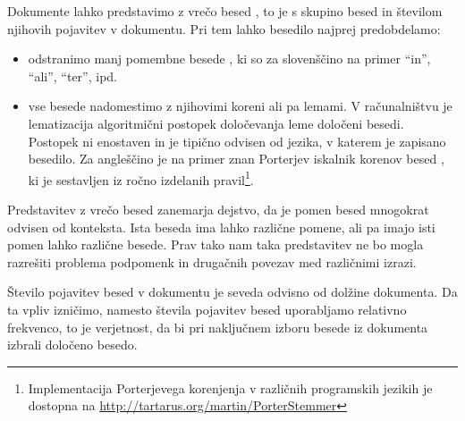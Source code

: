 Dokumente lahko predstavimo z vrečo besed , to je s
skupino besed in številom njihovih pojavitev v dokumentu. Pri tem
lahko besedilo najprej predobdelamo:
\begin{itemize}
\item odstranimo manj pomembne besede , ki so za
  slovenščino na primer ``in'', ``ali'', ``ter'', ipd.
\item vse besede nadomestimo z njihovimi koreni ali pa lemami. V
  računalništvu je lematizacija algoritmični postopek določevanja leme
  določeni besedi. Postopek ni enostaven in je tipično odvisen od
  jezika, v katerem je zapisano besedilo. Za angleščino je na primer
  znan Porterjev iskalnik korenov besed , ki je
  sestavljen iz ročno izdelanih pravil\footnote{Implementacija
    Porterjevega korenjenja v različnih programskih jezikih je
    dostopna na \url{http://tartarus.org/martin/PorterStemmer}}.
\end{itemize}

Predstavitev z vrečo besed zanemarja dejstvo, da je pomen besed
mnogokrat odvisen od konteksta. Ista beseda ima lahko različne pomene,
ali pa imajo isti pomen lahko različne besede. Prav tako nam taka
predstavitev ne bo mogla razrešiti problema podpomenk in drugačnih
povezav med različnimi izrazi.

Število pojavitev besed v dokumentu je seveda odvisno od dolžine
dokumenta. Da ta vpliv izničimo, namesto števila pojavitev besed
uporabljamo relativno frekvenco, to je verjetnost, da bi pri
naključnem izboru besede iz dokumenta izbrali določeno besedo.

\iffalse
Primer predobdelave besedila v programskem jeziku Python s knjižnico
iz paketa Orange2 je podan spodaj. Koda odstrani nepomembne besede,
ustvari seznam besed ter besedam iz tega seznama poišče leme.

\begin{python}
import orngText

def preprocess(text):
    pp = orngText.Preprocess(language='en')
    text.lower()
    text = pp.removeStopwords(text)
    tokens = pp.tokenize(text)
    lemmas = pp.lemmatize(tokens)
    
    print "Text:", text
    print "Tokens:", " ".join(tokens)
    print "Lemmas:", " ".join(lemmas)
    return lemmas

preprocess("The main point of writing a text is to convey " +
           "ideas, information, or knowledge to the reader.")
preprocess("He ensnared in an insider trading investigation " +
           "and a former director is expected to " +
           "surrender to authorities.")
\end{python}
\fi

